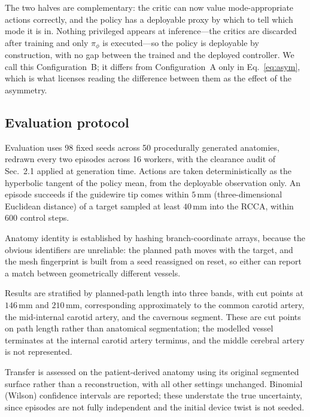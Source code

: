 The two halves are complementary: the critic can now value mode-appropriate actions correctly, and
the policy has a deployable proxy by which to tell which mode it is in. Nothing privileged appears
at inference---the critics are discarded after training and only $\pi_{\phi}$ is executed---so the
policy is deployable by construction, with no gap between the trained and the deployed controller.
We call this Configuration~B; it differs from Configuration~A only in Eq.~\eqref{eq:asym}, which is
what licenses reading the difference between them as the effect of the asymmetry.

\subsection{Evaluation protocol}
\label{sec:eval}

Evaluation uses 98 fixed seeds across 50 procedurally generated anatomies, redrawn every two
episodes across 16 workers, with the clearance audit of Sec.~2.1 applied at generation time.
Actions are taken deterministically as the hyperbolic tangent of the policy mean, from the
deployable observation only. An episode succeeds if the guidewire tip comes within $5$\,mm
(three-dimensional Euclidean distance) of a target sampled at least $40$\,mm into the RCCA, within
600 control steps.

Anatomy identity is established by hashing branch-coordinate arrays, because the obvious
identifiers are unreliable: the planned path moves with the target, and the mesh fingerprint is
built from a seed reassigned on reset, so either can report a match between geometrically different
vessels.

Results are stratified by planned-path length into three bands, with cut points at $146$\,mm and
$210$\,mm, corresponding approximately to the common carotid artery, the mid-internal carotid
artery, and the cavernous segment. These are cut points on path length rather than anatomical
segmentation; the modelled vessel terminates at the internal carotid artery terminus, and the
middle cerebral artery is not represented.

Transfer is assessed on the patient-derived anatomy using its original segmented surface rather
than a reconstruction, with all other settings unchanged. Binomial (Wilson) confidence intervals
are reported; these understate the true uncertainty, since episodes are not fully independent and
the initial device twist is not seeded.
